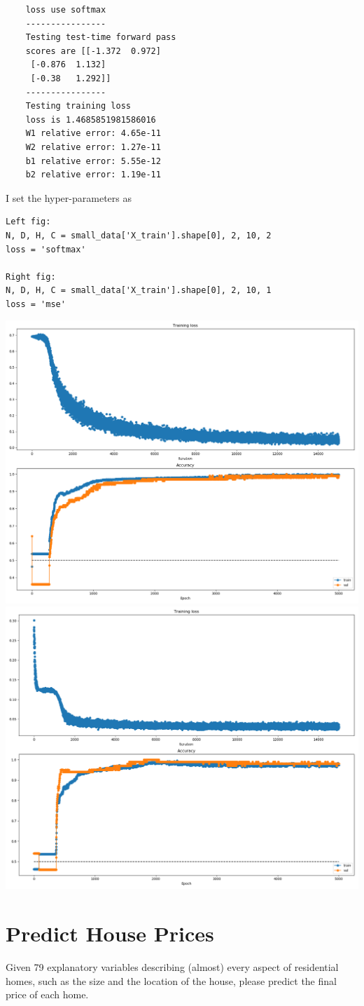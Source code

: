 \documentclass[12pt]{article}
\begin{document}
\begin{verbatim}
	loss use softmax
	----------------
	Testing test-time forward pass
	scores are [[-1.372  0.972]
	 [-0.876  1.132]
	 [-0.38   1.292]]
	----------------
	Testing training loss
	loss is 1.4685851981586016
	W1 relative error: 4.65e-11
	W2 relative error: 1.27e-11
	b1 relative error: 5.55e-12
	b2 relative error: 1.19e-11	
\end{verbatim}
I set the hyper-parameters as
\begin{verbatim}
Left fig: 
N, D, H, C = small_data['X_train'].shape[0], 2, 10, 2
loss = 'softmax'

Right fig:
N, D, H, C = small_data['X_train'].shape[0], 2, 10, 1
loss = 'mse'
\end{verbatim}

\begin{center}
	\includegraphics[width=.49\textwidth]{fig/2018-04-02-15-16-43.png}
	\includegraphics[width=.49\textwidth]{fig/2018-04-02-15-15-07.png} 
\end{center}

\section{Predict House Prices} \label{sec:4}
Given 79 explanatory variables describing (almost) every aspect of residential homes, such as the size  and the location of the house, please predict the final price of each home.
\end{document}
